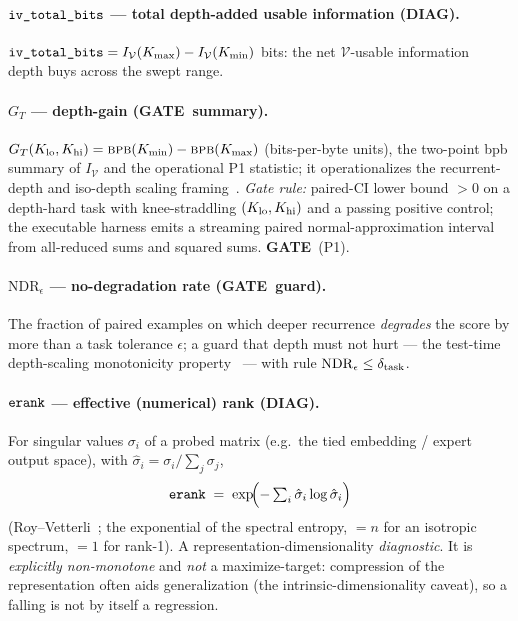 \documentclass[11pt]{article}
\newcommand{\bpb}{\textsc{bpb}}
\newcommand{\code}[1]{\texttt{#1}}
\newcommand{\GATE}{\textcolor{gate}{\textbf{GATE}}}
\newcommand{\DIAG}{\textcolor{diag}{\textbf{DIAG}}}
\begin{document}
\paragraph{\(\code{\detokenize{iv_total_bits}}\) --- total depth-added usable information (\DIAG).}
\(\code{\detokenize{iv_total_bits}}=I_{\mathcal V}(K_{\max})-I_{\mathcal V}(K_{\min})\) bits: the net
\(\mathcal V\)-usable information~\cite{vinfo} depth buys across the swept range.

\paragraph{\(G_T\) --- depth-gain (\GATE\ summary).}
\(G_T(K_{\rm lo},K_{\rm hi})=\bpb(K_{\min})-\bpb(K_{\max})\) (bits-per-byte units), the two-point bpb
summary of \(I_{\mathcal V}\) and the operational P1 statistic; it operationalizes the recurrent-depth
and iso-depth scaling framing~\cite{huginn,isodepth}.  \emph{Gate rule:} paired-CI lower
bound \(>0\) on a depth-hard task with knee-straddling \((K_{\rm lo},K_{\rm hi})\) and a passing
positive control; the executable harness emits a streaming paired normal-approximation interval from
all-reduced sums and squared sums.  \GATE\ (P1).

\paragraph{\(\mathrm{NDR}_\epsilon\) --- no-degradation rate (\GATE\ guard).}
The fraction of paired examples on which deeper recurrence \emph{degrades} the score by more than a
task tolerance \(\epsilon\); a guard that depth must not hurt --- the test-time depth-scaling
monotonicity property~\cite{huginn} --- with rule \(\mathrm{NDR}_\epsilon\le
\delta_{\rm task}\).

\paragraph{\(\code{\detokenize{erank}}\) --- effective (numerical) rank (\DIAG).}
For singular values \(\sigma_i\) of a probed matrix (e.g.\ the tied embedding / expert output space),
with \(\hat\sigma_i=\sigma_i/\sum_j\sigma_j\),
\begin{equation}
\label{eq:erank}
  \code{\detokenize{erank}}
  \;=\;
  \exp\!\Bigl(-\textstyle\sum_i\hat\sigma_i\log\hat\sigma_i\Bigr)
\end{equation}
(Roy--Vetterli~\cite{effrank}; the exponential of the spectral entropy, \(=n\) for an isotropic
spectrum, \(=1\) for rank-1).  A representation-dimensionality \emph{diagnostic}.  It is \emph{explicitly
non-monotone} and \emph{not} a maximize-target: compression of the representation often aids
generalization (the intrinsic-dimensionality caveat), so a falling \code{} is not by
itself a regression.
\end{document}
